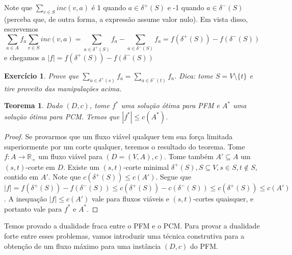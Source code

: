 \documentclass[]{article}
\newtheorem{teorema}{Teorema}
\newtheorem{exercicio}{Exercício}
\numberwithin{equation}{section}
\begin{document}
Note que $\sum_{v \in S} inc(v, a)$ é 1 quando $a \in \delta^+(S)$ e -1 quando
$a \in \delta^-(S)$ (perceba que, de outra forma, a expressão assume valor nulo).
Em vista disso, escrevemos
$$
\sum_{a \in A} f_a \sum_{v \in S} inc(v, a) =
\sum_{a \in \delta^+(S)} f_a - \sum_{a \in \delta^-(S)} f_a =
f(\delta^+(S)) - f(\delta^-(S))
$$
e chegamos a $|f| = f(\delta^+(S)) - f(\delta^-(S))$

\begin{exercicio}
  Prove que $\sum_{a \in \delta^+(s)} f_a = \sum_{a \in \delta^-(t)} f_a$.
  Dica: tome $S = V \setminus \{t\}$ e tire proveito das manipulações acima.
\end{exercicio}

\begin{teorema} \label{waekDualityMaxFlowMinCut}
  Dado $(D, c)$, tome $f^*$ uma solução ótima para PFM e $A^*$ uma solução ótima para
  PCM.
  Temos que $|f^*| \leq c(A^*)$.
\end{teorema}

\begin{proof}
  Se provarmos que um fluxo viável qualquer tem sua força limitada superiormente por
  um corte qualquer, teremos o resultado do teorema.
  Tome $f : A \to \mathbb{R}_+$ um fluxo viável para $(D = (V, A), c)$.
  Tome também $A' \subseteq A$ um $(s, t)$-corte em $D$.
  Existe um $(s, t)$-corte minimal $\delta^+(S), S \subseteq V, s \in S, t \notin S$,
  contido em $A'$.
  Note que $c(\delta^+(S)) \leq c(A')$.
  Segue que $|f| = f(\delta^+(S)) - f(\delta^-(S)) \leq
  c(\delta^+(S)) - c(\delta^-(S)) \leq c(\delta^+(S)) \leq c(A')$.
  A inequação $|f| \leq c(A')$ vale para fluxos viáveis e $(s, t)$-cortes quaisquer,
  e portanto vale para $f^*$ e $A^*$.
\end{proof}

Temos provado a dualidade fraca entre o PFM e o PCM.
Para provar a dualidade forte entre esses problemas, vamos introduzir uma técnica construtiva
para a obtenção de um fluxo máximo para uma instância $(D, c)$ do PFM.
\end{document}
